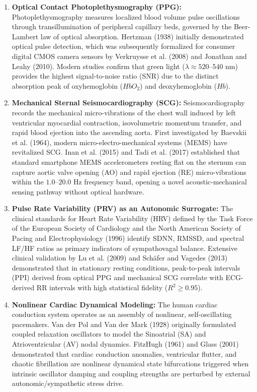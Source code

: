 \documentclass[11pt,a4paper]{article}
\begin{document}
\begin{enumerate}[leftmargin=2.5em]
    \item \textbf{Optical Contact Photoplethysmography (PPG):}
    Photoplethysmography measures localized blood volume pulse oscillations through transillumination of peripheral capillary beds, governed by the Beer-Lambert law of optical absorption. Hertzman (1938) initially demonstrated optical pulse detection, which was subsequently formalized for consumer digital CMOS camera sensors by Verkruysse et al. (2008) and Jonathan and Leahy (2010). Modern studies confirm that green light ($\lambda \approx 520\text{--}540\text{ nm}$) provides the highest signal-to-noise ratio (SNR) due to the distinct absorption peak of oxyhemoglobin ($HbO_2$) and deoxyhemoglobin ($Hb$).

    \item \textbf{Mechanical Sternal Seismocardiography (SCG):}
    Seismocardiography records the mechanical micro-vibrations of the chest wall induced by left ventricular myocardial contraction, isovolumetric momentum transfer, and rapid blood ejection into the ascending aorta. First investigated by Baevskii et al. (1964), modern micro-electro-mechanical systems (MEMS) have revitalized SCG. Inan et al. (2015) and Tadi et al. (2017) established that standard smartphone MEMS accelerometers resting flat on the sternum can capture aortic valve opening (AO) and rapid ejection (RE) micro-vibrations within the $1.0\text{--}20.0\text{ Hz}$ frequency band, opening a novel acoustic-mechanical sensing pathway without optical hardware.

    \item \textbf{Pulse Rate Variability (PRV) as an Autonomic Surrogate:}
    The clinical standards for Heart Rate Variability (HRV) defined by the Task Force of the European Society of Cardiology and the North American Society of Pacing and Electrophysiology (1996) identify SDNN, RMSSD, and spectral LF/HF ratios as primary indicators of sympathovagal balance. Extensive clinical validation by Lu et al. (2009) and Schäfer and Vagedes (2013) demonstrated that in stationary resting conditions, peak-to-peak intervals (PPI) derived from optical PPG and mechanical SCG correlate with ECG-derived RR intervals with high statistical fidelity ($R^2 \ge 0.95$).

    \item \textbf{Nonlinear Cardiac Dynamical Modeling:}
    The human cardiac conduction system operates as an assembly of nonlinear, self-oscillating pacemakers. Van der Pol and Van der Mark (1928) originally formulated coupled relaxation oscillators to model the Sinoatrial (SA) and Atrioventricular (AV) nodal dynamics. FitzHugh (1961) and Glass (2001) demonstrated that cardiac conduction anomalies, ventricular flutter, and chaotic fibrillation are nonlinear dynamical state bifurcations triggered when intrinsic oscillator damping and coupling strengths are perturbed by external autonomic/sympathetic stress drive.
\end{enumerate}
\end{document}
